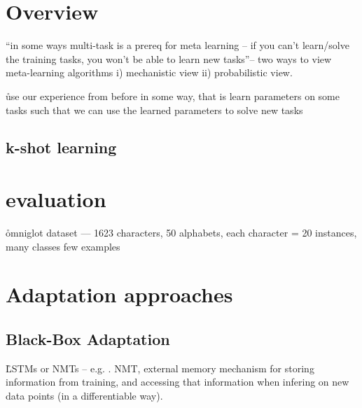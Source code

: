 \section{Overview}




\r{``in some ways multi-task is a prereq for meta learning -- if you can't learn/solve the training tasks, you won't be able to learn new tasks''-- two ways to view meta-learning algorithms i) mechanistic view ii) probabilistic view.}

\r{use our experience from before in some way, that is learn parameters on some tasks such that we can use the learned parameters to solve new tasks}



\subsection{k-shot learning}



\section{evaluation}

\r{omniglot dataset --- 1623 characters, 50 alphabets, each character = 20 instances, many classes few examples}


\section{Adaptation approaches}

\subsection{Black-Box Adaptation}

\r{LSTMs or NMTs -- e.g. \cite{santoro2016meta}. NMT, external memory mechanism for storing information from training, and accessing that information when infering on new data points (in a differentiable way).}

